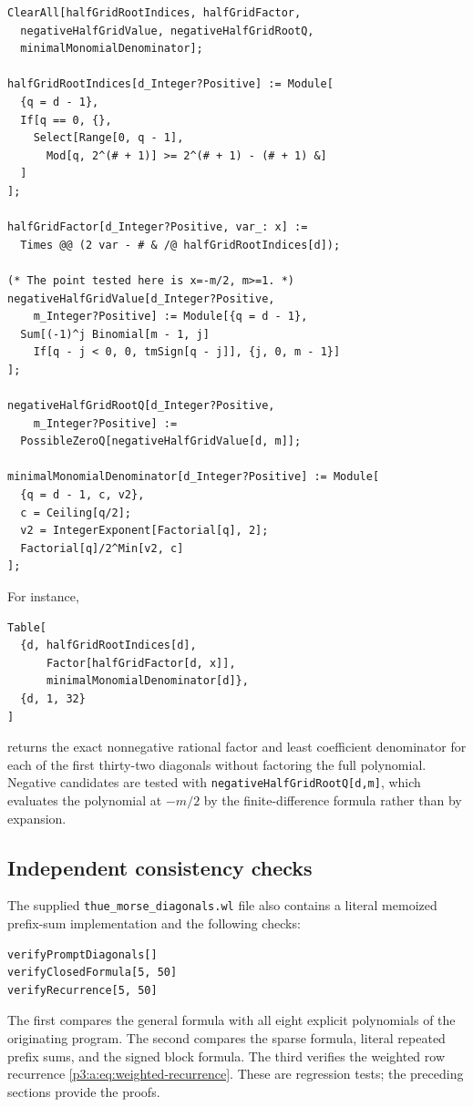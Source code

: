 \documentclass[11pt,oneside]{article}
\numberwithin{equation}{section}
\theoremstyle{definition}
\theoremstyle{remark}
\begin{document}
\begin{lstlisting}[language=Wolfram,caption={Exact rational-root tests and coefficient denominator.}]
ClearAll[halfGridRootIndices, halfGridFactor,
  negativeHalfGridValue, negativeHalfGridRootQ,
  minimalMonomialDenominator];

halfGridRootIndices[d_Integer?Positive] := Module[
  {q = d - 1},
  If[q == 0, {},
    Select[Range[0, q - 1],
      Mod[q, 2^(# + 1)] >= 2^(# + 1) - (# + 1) &]
  ]
];

halfGridFactor[d_Integer?Positive, var_: x] :=
  Times @@ (2 var - # & /@ halfGridRootIndices[d]);

(* The point tested here is x=-m/2, m>=1. *)
negativeHalfGridValue[d_Integer?Positive,
    m_Integer?Positive] := Module[{q = d - 1},
  Sum[(-1)^j Binomial[m - 1, j]
    If[q - j < 0, 0, tmSign[q - j]], {j, 0, m - 1}]
];

negativeHalfGridRootQ[d_Integer?Positive,
    m_Integer?Positive] :=
  PossibleZeroQ[negativeHalfGridValue[d, m]];

minimalMonomialDenominator[d_Integer?Positive] := Module[
  {q = d - 1, c, v2},
  c = Ceiling[q/2];
  v2 = IntegerExponent[Factorial[q], 2];
  Factorial[q]/2^Min[v2, c]
];
\end{lstlisting}

For instance,
\begin{lstlisting}[language=Wolfram]
Table[
  {d, halfGridRootIndices[d],
      Factor[halfGridFactor[d, x]],
      minimalMonomialDenominator[d]},
  {d, 1, 32}
]
\end{lstlisting}
returns the exact nonnegative rational factor and least coefficient
denominator for each of the first thirty-two diagonals without factoring the
full polynomial.  Negative candidates are tested with
\texttt{negativeHalfGridRootQ[d,m]}, which evaluates the polynomial at
\(-m/2\) by the finite-difference formula rather than by expansion.

\subsection{Independent consistency checks}

The supplied \texttt{thue\_morse\_diagonals.wl} file also contains a literal
memoized prefix-sum implementation and the following checks:
\begin{lstlisting}[language=Wolfram]
verifyPromptDiagonals[]
verifyClosedFormula[5, 50]
verifyRecurrence[5, 50]
\end{lstlisting}
The first compares the general formula with all eight explicit polynomials of
the originating program.  The second compares the sparse formula, literal repeated prefix
sums, and the signed block formula.  The third verifies the weighted row
recurrence \cref{p3:a:eq:weighted-recurrence}.  These are regression tests; the preceding
sections provide the proofs.
\end{document}
